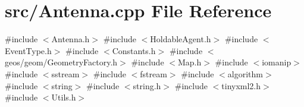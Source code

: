 \section{src/\+Antenna.cpp File Reference}
\label{_antenna_8cpp}
{\ttfamily \#include $<$Antenna.\+h$>$}\newline
{\ttfamily \#include $<$Holdable\+Agent.\+h$>$}\newline
{\ttfamily \#include $<$Event\+Type.\+h$>$}\newline
{\ttfamily \#include $<$Constants.\+h$>$}\newline
{\ttfamily \#include $<$geos/geom/\+Geometry\+Factory.\+h$>$}\newline
{\ttfamily \#include $<$Map.\+h$>$}\newline
{\ttfamily \#include $<$iomanip$>$}\newline
{\ttfamily \#include $<$sstream$>$}\newline
{\ttfamily \#include $<$fstream$>$}\newline
{\ttfamily \#include $<$algorithm$>$}\newline
{\ttfamily \#include $<$string$>$}\newline
{\ttfamily \#include $<$string.\+h$>$}\newline
{\ttfamily \#include $<$tinyxml2.\+h$>$}\newline
{\ttfamily \#include $<$Utils.\+h$>$}\newline
